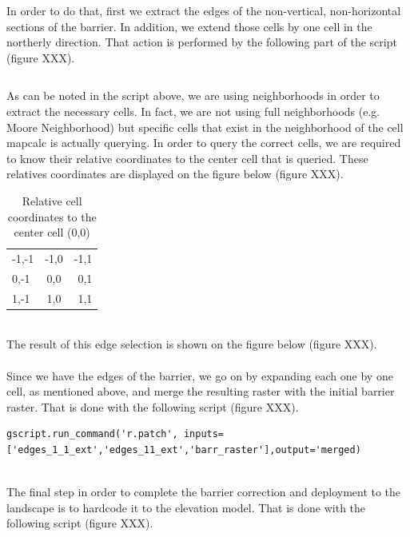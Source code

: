 In order to do that, first we extract the edges of the non-vertical, non-horizontal sections of the barrier. In addition, we extend those cells by one cell in the northerly direction. That action is performed by the following part of the script (figure XXX).

\begin{lstlisting}

\end{lstlisting}

As can be noted in the script above, we are using neighborhoods in order to extract the necessary cells. In fact, we are not using full neighborhoods (e.g. Moore Neighborhood) but specific cells that exist in the neighborhood of the cell mapcalc is actually querying. In order to query the correct cells, we are required to know their relative coordinates to the center cell that is queried. These relatives coordinates are displayed on the figure below (figure XXX).\\

\begin{table}
\caption{Relative cell coordinates to the center cell (0,0)}
\begin{tabular}{l | c | r}
-1,-1 & -1,0 & -1,1 \\
0,-1 & 0,0 & 0,1 \\
1,-1 & 1,0 & 1,1 \\
\end{tabular}
\end{table}\\

The result of this edge selection is shown on the figure below (figure XXX).\\
\\


Since we have the edges of the barrier, we go on by expanding each one by one cell, as mentioned above, and merge the resulting raster with the initial barrier raster. That is done with the following script (figure XXX).\\

\begin{lstlisting}
gscript.run_command('r.patch', inputs=['edges_1_1_ext','edges_11_ext','barr_raster'],output='merged)
\end{lstlisting}\\

The final step in order to complete the barrier correction and deployment to the landscape is to hardcode it to the elevation model. That is done with the following script (figure XXX).\\

